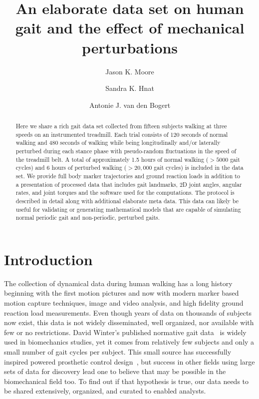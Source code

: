 \documentclass[10pt,a4paper,twocolumn]{article}
\begin{document}
\title{An elaborate data set on human gait and the effect of mechanical
  perturbations}

\author[1]{Jason K. Moore}
\author[1]{Sandra K. Hnat}
\author[1]{Antonie J. van den Bogert}


\maketitle
\thispagestyle{fancy}

\begin{abstract}

  Here we share a rich gait data set collected from fifteen subjects walking at
  three speeds on an instrumented treadmill. Each trial consists of 120 seconds
  of normal walking and 480 seconds of walking while being longitudinally
  and/or laterally perturbed during each stance phase with pseudo-random
  fluctuations in the speed of the treadmill belt. A total of approximately 1.5
  hours of normal walking ($>5000$ gait cycles) and 6 hours of perturbed walking
  ($>20,000$ gait cycles) is included in the data set. We provide full body
  marker trajectories and ground reaction loads in addition to a presentation of
  processed data that includes gait landmarks, 2D joint angles, angular rates,
  and joint torques and the software used for the computations. The protocol is
  described in detail along with additional elaborate meta data. This data can
  likely be useful for validating or generating mathematical models that are
  capable of simulating normal periodic gait and non-periodic, perturbed gaits.

\end{abstract}
\clearpage

\section*{Introduction}
%
The collection of dynamical data during human walking has a long history
beginning with the first motion pictures and now with modern marker based
motion capture techniques, image and video analysis, and high fidelity ground
reaction load measurements. Even though years of data on thousands of subjects
now exist, this data is not widely disseminated, well organized, nor available
with few or no restrictions. David Winter's published normative gait
data~\cite{Winter1990} is widely used in biomechanics studies, yet it comes
from relatively few subjects and only a small number of gait cycles per
subject. This small source has successfully inspired powered prosthetic control
design~\cite{GoldfarbXXXX}, but success in other fields using large sets of
data for discovery lead one to believe that may be possible in the
biomechanical field too. To find out if that hypothesis is true, our data needs
to be shared extensively, organized, and curated to enabled analysts.
\end{document}
